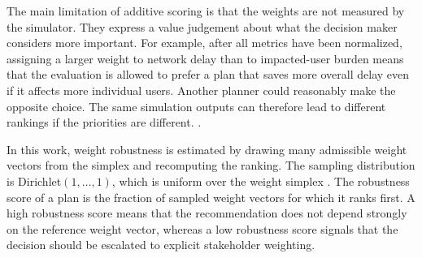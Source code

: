 The main limitation of additive scoring is that the weights are not measured by the simulator.
They express a value judgement about what the decision maker considers more important. For
example, after all metrics have been normalized, assigning a larger weight to network delay than
to impacted-user burden means that the evaluation is allowed to prefer a plan that saves more
overall delay even if it affects more individual users. Another planner could reasonably make the
opposite choice. The same simulation outputs can therefore lead to different rankings if the
priorities are different. \cite{triantaphyllou_sensitivity_1997}.

In this work, weight robustness is estimated by drawing many admissible weight vectors from the
simplex and recomputing the ranking. The sampling distribution is Dirichlet$(1,\ldots,1)$, which is
uniform over the weight simplex \cite{stan_dirichlet_simplex}.
The robustness score of a plan is the fraction of sampled weight vectors for which it ranks first.
A high robustness score means that the recommendation does not depend strongly on the reference
weight vector, whereas a low robustness score signals that the decision should be escalated to
explicit stakeholder weighting.
